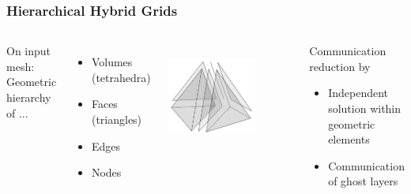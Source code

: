 \documentclass[t,compress=false,usepdftitle=false]{beamer}
\begin{document}
\begin{frame}\frametitle{Hierarchical Hybrid Grids}
\begin{columns}
On input mesh:\\
Geometric hierarchy of ...\\
\vspace{1mm}
\begin{itemize}
 \item Volumes (tetrahedra)
 \item Faces (triangles)
 \item Edges
 \item Nodes
\end{itemize}
\vspace{-5mm}
\hspace{18mm}\\
\vspace{-6mm}
\centering\includegraphics[width=0.7\textwidth]{primitives.png}\\
\begin{myColorBox}{.9}{}\color{linkcolor}
\centering
Communication reduction by
\begin{itemize}
 \item Independent solution within geometric elements
 \item Communication of ghost layers
\end{itemize}
\end{myColorBox}
\end{columns}
\end{frame}
\end{document}
